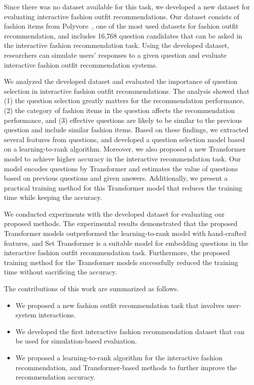 Since there was no dataset available for this task,
we developed a new dataset for evaluating interactive fashion outfit recommendations. 
Our dataset consists of fashion items from Polyvore~\cite{han2017learning}, one of the most used datasets for fashion outfit recommendation, and includes 16,768 question candidates that can be asked in the interactive fashion recommendation task.
Using the developed dataset, researchers can simulate users' responses to a given question
and evaluate interactive fashion outfit recommendation systems.


We analyzed the developed dataset and evaluated the importance of question selection in interactive fashion outfit recommendations. 
The analysis showed that (1) the question selection greatly matters for the recommendation performance, (2) the category of fashion items in the question affects the recommendation performance,
and (3) effective questions are likely to be similar to the previous question and include similar fashion items.  
Based on these findings, we extracted several features from questions, 
and developed a question selection model based on a learning-to-rank algorithm. 
Moreover, we also proposed a new Transformer model to achieve higher accuracy in the interactive recommendation task. 
Our model encodes questions by Transformer
and estimates the value of questions based on previous questions and given answers.
Additionally, we present a practical training method for this Transformer model that reduces the training time while keeping the accuracy.

We conducted experiments with the developed dataset for evaluating our proposed methods.
The experimental results demonstrated that 
the proposed Transformer models outperformed the learning-to-rank model with hand-crafted features,
and Set Transformer is a suitable model for embedding questions in the interactive fashion outfit recommendation task.
Furthermore, the proposed training method for the Transformer models successfully reduced the training time without sacrificing the accuracy.

The contributions of this work are summarized as follows.
\begin{itemize}
\item We proposed a new fashion outfit recommendation task that involves user-system interactions.
\item We developed the first interactive fashion recommendation dataset that can be used for simulation-based evaluation.
\item We proposed a learning-to-rank algorithm for the interactive fashion recommendation,
and Transformer-based methods to further improve the recommendation accuracy. 
\end{itemize}

